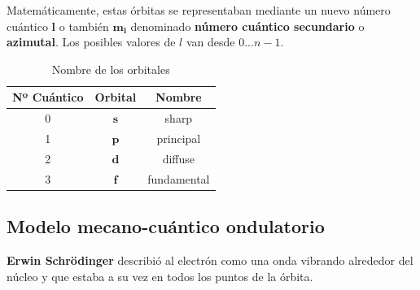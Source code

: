 Matemáticamente, estas órbitas se representaban mediante un nuevo número cuántico  \(\bm{l}\) o también \(\bm{m_l}\) denominado \textbf{número cuántico secundario} o \textbf{azimutal}.
Los posibles valores de \(l\) van desde \(0 ... n-1\).
\begin{table}[H]
    \centering
    \caption{Nombre de los orbitales}
    \vspace{-5pt}
    \begin{tabular}{@{}ccc@{}}
        \toprule
        \textbf{Nº Cuántico} & \textbf{Orbital} & \textbf{Nombre} \\
        \bottomrule
        0                    & \(\bm{s}\)       & sharp \\[3pt]
        1                    & \(\bm{p}\)       & principal              \\[3pt]
        2                    & \(\bm{d}\)       & diffuse \\[3pt]
        3                    & \(\bm{f}\)       & fundamental     \\
        \bottomrule
    \end{tabular}
    \label{tab:nombre_orbitales}
\end{table}

\subsection{Modelo mecano-cuántico ondulatorio}

\textbf{Erwin Schrödinger} describió al electrón como una onda vibrando alrededor del núcleo y que estaba a su vez en todos los puntos de la órbita.

